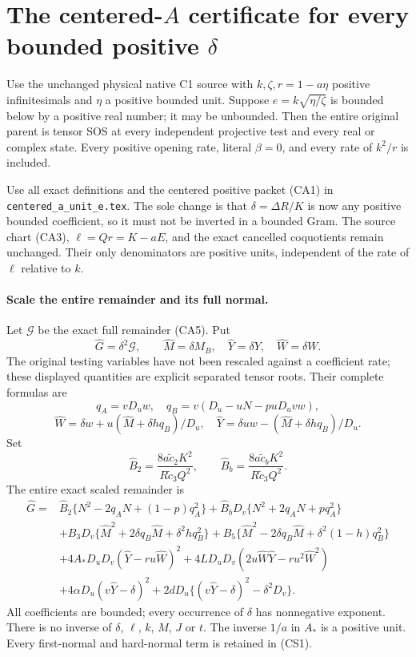 \section[The centered-A certificate for every bounded positive delta]{The centered-$A$ certificate for every bounded positive $\delta$}

\begin{theorem}
Use the unchanged physical native C1 source with $k,\zeta,r=1-a\eta$
positive infinitesimals and $\eta$ a positive bounded unit. Suppose
$e=k\sqrt{\eta/\zeta}$ is bounded below by a positive real number;
it may be unbounded. Then the entire original parent is tensor SOS at
every independent projective test and every real or complex state.
Every positive opening rate, literal $\beta=0$, and every rate of
$k^2/r$ is included.
\end{theorem}

Use all exact definitions and the centered positive packet (CA1) in
\texttt{centered\_a\_unit\_e.tex}. The sole change is that
$\delta=\Delta R/K$ is now any positive bounded coefficient, so it
must not be inverted in a bounded Gram. The source chart (CA3),
$\ell=Qr=K-aE$, and the exact cancelled coquotients remain unchanged.
Their only denominators are positive units, independent of the rate
of $\ell$ relative to $k$.

\paragraph{Scale the entire remainder and its full normal.}
Let $\mathscr G$ be the exact full remainder (CA5). Put
\[
 \widehat G=\delta^2\mathscr G,\qquad
 \widehat M=\delta M_B,\quad \widehat Y=\delta Y,
 \quad\widehat W=\delta W.
\]
The original testing variables have not been rescaled against a
coefficient rate; these displayed quantities are explicit separated
tensor roots. Their complete formulas are
\[
 q_A=vD_uw,\quad q_B=v(D_u-uN-puD_uv w),
\]
\[
 \widehat W=\delta w+u(\widehat M+\delta hq_B)/D_u,
 \quad\widehat Y=\delta uw-(\widehat M+\delta hq_B)/D_u.
\]
Set
\[
 \widehat B_2=\frac{8a\widetilde c_2K^2}{R\widetilde c_3Q^2},
 \qquad
 \widehat B_b=\frac{8a\widetilde c_bK^2}{R\widetilde c_3Q^2}.
\]
The entire exact scaled remainder is
\begin{align*}
\widehat G={}&\widehat B_2\{N^2-2q_AN+(1-p)q_A^2\}
 +\widehat B_bD_v\{N^2+2q_AN+pq_A^2\}\\
&+B_3D_v\{\widehat M^2+2\delta q_B\widehat M+\delta^2hq_B^2\}
 +B_5\{\widehat M^2-2\delta q_B\widehat M+\delta^2(1-h)q_B^2\}\\
&+4A_*D_uD_v(\widehat Y-r u\widehat W)^2
 +4LD_uD_v(2u\widehat W\widehat Y-r u^2\widehat W^2)\\
&+4\alpha D_u(v\widehat Y-\delta)^2
 +2dD_u\{(v\widehat Y-\delta)^2-\delta^2D_v\}.
 \tag{CS1}
\end{align*}
All coefficients are bounded; every occurrence of $\delta$ has
nonnegative exponent. There is no inverse of $\delta$, $\ell$, $k$,
$M$, $J$ or $t$. The inverse $1/a$ in $A_*$ is a positive unit.
Every first-normal and hard-normal term is retained in (CS1).

